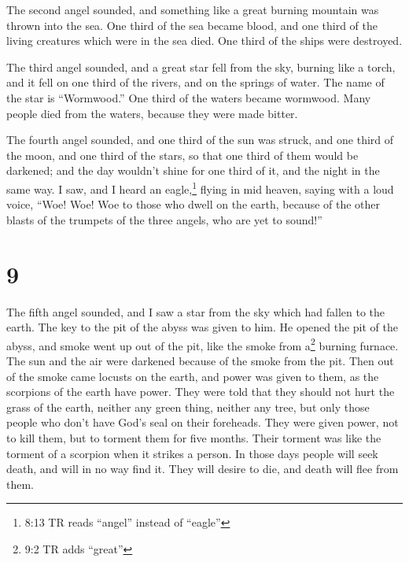  The second angel sounded, and something like a great
burning mountain was thrown into the sea. One third of the sea became
blood,  and one third of the living creatures which were in
the sea died. One third of the ships were destroyed.

 The third angel sounded, and a great star fell from the
sky, burning like a torch, and it fell on one third of the rivers, and
on the springs of water.  The name of the star is
``Wormwood.'' One third of the waters became wormwood. Many people died
from the waters, because they were made bitter.

 The fourth angel sounded, and one third of the sun was
struck, and one third of the moon, and one third of the stars, so that
one third of them would be darkened; and the day wouldn't shine for one
third of it, and the night in the same way.  I saw, and I
heard an eagle,\footnote{8:13 TR reads ``angel'' instead of ``eagle''}
flying in mid heaven, saying with a loud voice, ``Woe! Woe! Woe to those
who dwell on the earth, because of the other blasts of the trumpets of
the three angels, who are yet to sound!''

\hypertarget{section-8}{%
\section{9}\label{section-8}}

 The fifth angel sounded, and I saw a star from the sky
which had fallen to the earth. The key to the pit of the abyss was given
to him.  He opened the pit of the abyss, and smoke went up
out of the pit, like the smoke from a\footnote{9:2 TR adds ``great''}
burning furnace. The sun and the air were darkened because of the smoke
from the pit.  Then out of the smoke came locusts on the
earth, and power was given to them, as the scorpions of the earth have
power.  They were told that they should not hurt the grass
of the earth, neither any green thing, neither any tree, but only those
people who don't have God's seal on their foreheads.  They
were given power, not to kill them, but to torment them for five months.
Their torment was like the torment of a scorpion when it strikes a
person.  In those days people will seek death, and will in
no way find it. They will desire to die, and death will flee from them.


